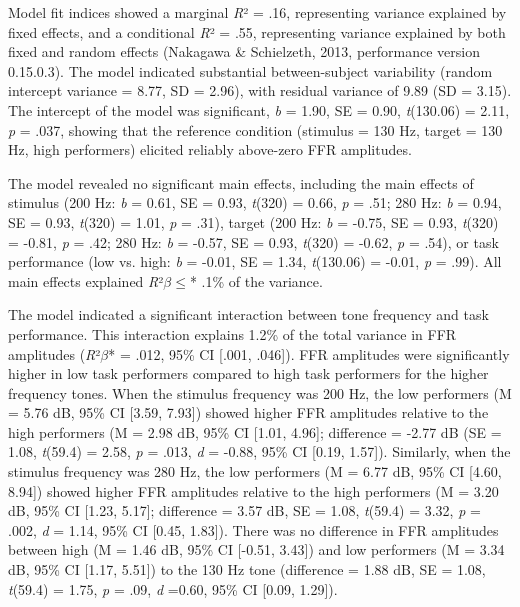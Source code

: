 \documentclass{article}
\begin{document}
Model fit indices showed a marginal \textit{R}² = .16, representing variance explained by fixed effects, and a conditional \textit{R}² = .55, representing variance explained by both fixed and random effects (Nakagawa \& Schielzeth, 2013, performance version 0.15.0.3). The model indicated substantial between-subject variability (random intercept variance = 8.77, SD = 2.96), with residual variance of 9.89 (SD = 3.15). The intercept of the model was significant, \textit{b} = 1.90, SE = 0.90, \textit{t}(130.06) = 2.11, \textit{p} = .037, showing that the reference condition (stimulus = 130 Hz, target = 130 Hz, high performers) elicited reliably above-zero FFR amplitudes.

The model revealed no significant main effects, including the main effects of stimulus (200 Hz: \textit{b} = 0.61, SE = 0.93, \textit{t}(320) = 0.66, \textit{p} = .51; 280 Hz: \textit{b} = 0.94, SE = 0.93, \textit{t}(320) = 1.01, \textit{p} = .31), target (200 Hz: \textit{b} = -0.75, SE = 0.93, \textit{t}(320) = -0.81, \textit{p} = .42; 280 Hz: \textit{b} = -0.57, SE = 0.93, \textit{t}(320) = -0.62, \textit{p} = .54), or task performance (low vs. high: \textit{b} = -0.01, SE = 1.34, \textit{t}(130.06) = -0.01, \textit{p} = .99). All main effects explained \textit{R}²$\beta \leq$* .1\% of the variance.

The model indicated a significant interaction between tone frequency and task performance. This interaction explains 1.2\% of the total variance in FFR amplitudes (\textit{R}²$\beta$* = .012, 95\% CI [.001, .046]). FFR amplitudes were significantly higher in low task performers compared to high task performers for the higher frequency tones. When the stimulus frequency was 200 Hz, the low performers (M = 5.76 dB, 95\% CI [3.59, 7.93]) showed higher FFR amplitudes relative to the high performers (M = 2.98 dB, 95\% CI [1.01, 4.96]; difference = -2.77 dB (SE = 1.08, \textit{t}(59.4) = 2.58, \textit{p} = .013, \textit{d} = -0.88, 95\% CI [0.19, 1.57]). Similarly, when the stimulus frequency was 280 Hz, the low performers (M = 6.77 dB, 95\% CI [4.60, 8.94]) showed higher FFR amplitudes relative to the high performers (M = 3.20 dB, 95\% CI [1.23, 5.17]; difference = 3.57 dB, SE = 1.08, \textit{t}(59.4) = 3.32, \textit{p} = .002, \textit{d} = 1.14, 95\% CI [0.45, 1.83]). There was no difference in FFR amplitudes between high (M = 1.46 dB, 95\% CI [-0.51, 3.43]) and low performers (M = 3.34 dB, 95\% CI [1.17, 5.51]) to the 130 Hz tone (difference = 1.88 dB, SE = 1.08, \textit{t}(59.4) = 1.75, \textit{p} = .09, \textit{d} =0.60, 95\% CI [0.09, 1.29]).
\end{document}

